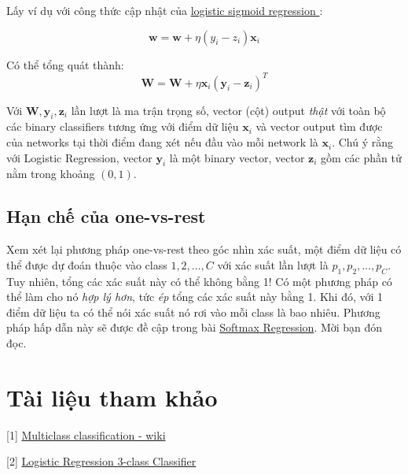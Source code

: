 Lấy ví dụ với công thức cập nhật của \href{http://machinelearningcoban.com/2017/01/27/logisticregression/#cong-thuc-cap-nhat-cho-logistic-sigmoid-regression}{logistic sigmoid regression }: 
 
\begin{equation} 
\mathbf{w} = \mathbf{w} + \eta(y_i - z_i)\mathbf{x}_i 
\end{equation} 
 
Có thể tổng quát thành: 
\begin{equation} 
\mathbf{W} = \mathbf{W} + \eta\mathbf{x}_i(\mathbf{y}_i - \mathbf{z}_i)^T 
\end{equation} 
 
Với $\mathbf{W}, \mathbf{y}_i, \mathbf{z}_i$ lần lượt là ma trận trọng số, vector (cột) output \textit{thật} với toàn bộ các binary classifiers tương ứng với điểm dữ liệu $\mathbf{x}_i$ và vector output tìm được của networks tại thời điểm đang xét nếu đầu vào mỗi network là $\mathbf{x}_i$. Chú ý rằng với Logistic Regression, vector $\mathbf{y}_i$ là một binary vector, vector $\mathbf{z}_i$ gồm các phần tử nằm trong khoảng $(0, 1)$.  
 
 
\subsection{Hạn chế của one-vs-rest}
Xem xét lại phương pháp one-vs-rest theo góc nhìn xác suất, một điểm dữ liệu có thể được dự đoán thuộc vào class $1, 2, \dots, C$ với xác suất lần lượt là $p_1, p_2, \dots, p_C$. Tuy nhiên, tổng các xác suất này có thể không bằng 1! Có một phương pháp có thể làm cho nó \textit{hợp lý hơn}, tức \textit{ép} tổng các xác suất này bằng 1. Khi đó, với 1 điểm dữ liệu ta có thể nói xác suất nó rơi vào mỗi class là bao nhiêu. Phương pháp hấp dẫn này sẽ được đề cập trong bài \href{http://machinelearningcoban.com/2017/02/16/softmax/}{Softmax Regression}. Mời bạn đón đọc. 
 
 
\section{Tài liệu tham khảo}
 
 
[1] \href{https://en.wikipedia.org/wiki/Multiclass_classification}{Multiclass classification - wiki} 
 
[2] \href{http://scikit-learn.org/stable/auto_examples/linear_model/plot_iris_logistic.html}{Logistic Regression 3-class Classifier} 
